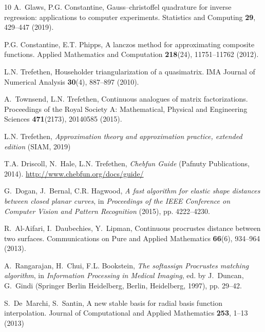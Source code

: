 \documentclass[pdflatex,iicol]{sn-jnl}%
\theoremstyle{thmstyleone}%
\theoremstyle{thmstyletwo}%
\theoremstyle{thmstylethree}%
\begin{document}
\begin{thebibliography}{10}
A.~Glaws, P.G. Constantine, Gauss--christoffel quadrature for inverse regression: applications to computer experiments.
\newblock Statistics and Computing \textbf{29}, 429--447 (2019).
\newblock {}

P.G. Constantine, E.T. Phipps, A lanczos method for approximating composite functions.
\newblock Applied Mathematics and Computation \textbf{218}(24), 11751--11762 (2012).
\newblock {}

L.N. Trefethen, Householder triangularization of a quasimatrix.
\newblock IMA Journal of Numerical Analysis \textbf{30}(4), 887--897 (2010).
\newblock {}

A.~Townsend, L.N. Trefethen, Continuous analogues of matrix factorizations.
\newblock Proceedings of the Royal Society A: Mathematical, Physical and Engineering Sciences \textbf{471}(2173), 20140585 (2015).
\newblock {}

L.N. Trefethen, \emph{Approximation theory and approximation practice, extended edition} (SIAM, 2019)

T.A. Driscoll, N.~Hale, L.N. Trefethen, \emph{Chebfun Guide} (Pafnuty Publications, 2014).
\newblock \urlprefix\url{http://www.chebfun.org/docs/guide/}

G.~Dogan, J.~Bernal, C.R. Hagwood, \emph{A fast algorithm for elastic shape distances between closed planar curves}, in \emph{Proceedings of the IEEE Conference on Computer Vision and Pattern Recognition} (2015), pp. 4222--4230.
\newblock {}

R.~Al-Aifari, I.~Daubechies, Y.~Lipman, Continuous procrustes distance between two surfaces.
\newblock Communications on Pure and Applied Mathematics \textbf{66}(6), 934--964 (2013).
\newblock {}

A.~Rangarajan, H.~Chui, F.L. Bookstein, \emph{The softassign Procrustes matching algorithm}, in \emph{Information Processing in Medical Imaging}, ed. by J.~Duncan, G.~Gindi (Springer Berlin Heidelberg, Berlin, Heidelberg, 1997), pp. 29--42.
\newblock {}

S.~De~{M}archi, S.~Santin, A new stable basis for radial basis function interpolation.
\newblock Journal of Computational and Applied Mathematics \textbf{253}, 1--13 (2013)


\end{thebibliography}
\end{document}
